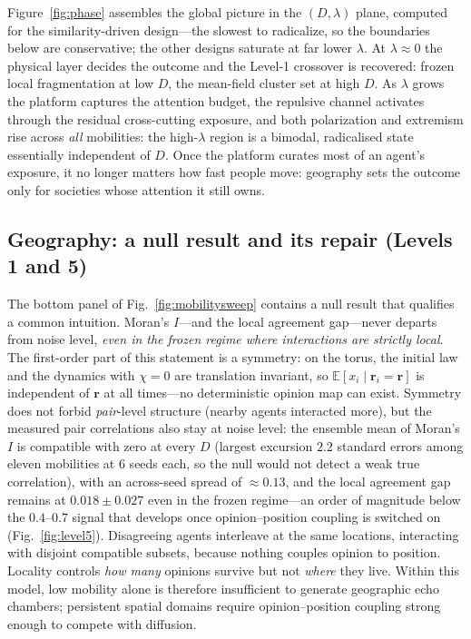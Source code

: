 \documentclass[5p,times,twocolumn]{elsarticle}
\newcommand{\rr}{\mathbf{r}}
\begin{document}
Figure~\ref{fig:phase} assembles the global picture in the $(D, \lambda)$
plane, computed for the similarity-driven design---the slowest to
radicalize, so the boundaries below are conservative; the other designs
saturate at far lower $\lambda$. At $\lambda \approx 0$ the physical
layer decides the outcome and
the Level-1 crossover is recovered: frozen local fragmentation at low $D$,
the mean-field cluster set at high $D$. As $\lambda$ grows the platform
captures the attention budget, the repulsive channel activates through the
residual cross-cutting exposure, and both polarization and extremism rise
across \emph{all} mobilities: the high-$\lambda$ region is a bimodal,
radicalised state essentially independent of $D$. Once the platform
curates most of an agent's exposure, it no longer matters how fast people
move: geography sets the outcome only for societies whose attention it
still owns.

\subsection{Geography: a null result and its repair (Levels 1 and 5)}
\label{sec:geography}

The bottom panel of Fig.~\ref{fig:mobilitysweep} contains a null result
that qualifies a common intuition. Moran's $I$---and the local agreement
gap---never departs from noise level, \emph{even in the frozen regime
where interactions are strictly local}. The first-order part of this
statement is a symmetry: on the torus, the initial law and the dynamics
with $\chi = 0$ are translation invariant, so
$\mathbb{E}[x_i \mid \rr_i = \rr]$ is independent of $\rr$ at all
times---no deterministic opinion map can exist. Symmetry does not forbid
\emph{pair}-level structure (nearby agents interacted more), but the
measured pair correlations also stay at noise level: the ensemble mean of
Moran's $I$ is compatible with zero at every $D$ (largest excursion
$2.2$ standard errors among eleven mobilities at $6$ seeds each, so the
null would not detect a weak true correlation), with an across-seed
spread of $\approx 0.13$, and the local agreement gap remains at
$0.018 \pm 0.027$ even in the frozen regime---an order of magnitude below
the $0.4$--$0.7$ signal that develops once opinion--position coupling is
switched on (Fig.~\ref{fig:level5}). Disagreeing agents
interleave at the same locations, interacting with disjoint compatible
subsets, because nothing couples opinion to position. Locality controls
\emph{how many} opinions survive but not \emph{where} they live. Within
this model, low mobility alone is therefore insufficient to generate
geographic echo chambers; persistent spatial domains require
opinion--position coupling strong enough to compete with diffusion.
\end{document}
